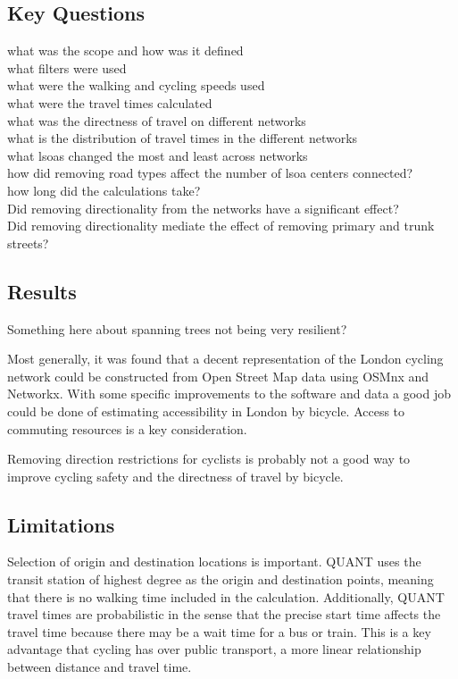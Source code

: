 \subsection{Key Questions}
what was the scope and how was it defined \\ 
what filters were used \\
what were the walking and cycling speeds used \\
what were the travel times calculated \\
what was the directness of travel on different networks \\
what is the distribution of travel times in the different networks \\
what lsoas changed the most and least across networks \\
how did removing road types affect the number of lsoa centers connected? \\
how long did the calculations take? \\
Did removing directionality from the networks have a significant effect? \\
Did removing directionality mediate the effect of removing primary and trunk streets? \\



\subsection{Results}

Something here about spanning trees not being very resilient? 

Most generally, it was found that a decent representation of the London cycling network could be constructed from Open Street Map data using OSMnx and Networkx. With some specific improvements to the software and data a good job could be done of estimating accessibility in London by bicycle. Access to commuting resources is a key consideration.

Removing direction restrictions for cyclists is probably not a good way to improve cycling safety and the directness of travel by bicycle. 

\subsection{Limitations}

Selection of origin and destination locations is important. QUANT uses the transit station of highest degree as the origin and destination points, meaning that there is no walking time included in the calculation. Additionally, QUANT travel times are probabilistic in the sense that the precise start time affects the travel time because there may be a wait time for a bus or train. This is a key advantage that cycling has over public transport, a more linear relationship between distance and travel time. 

